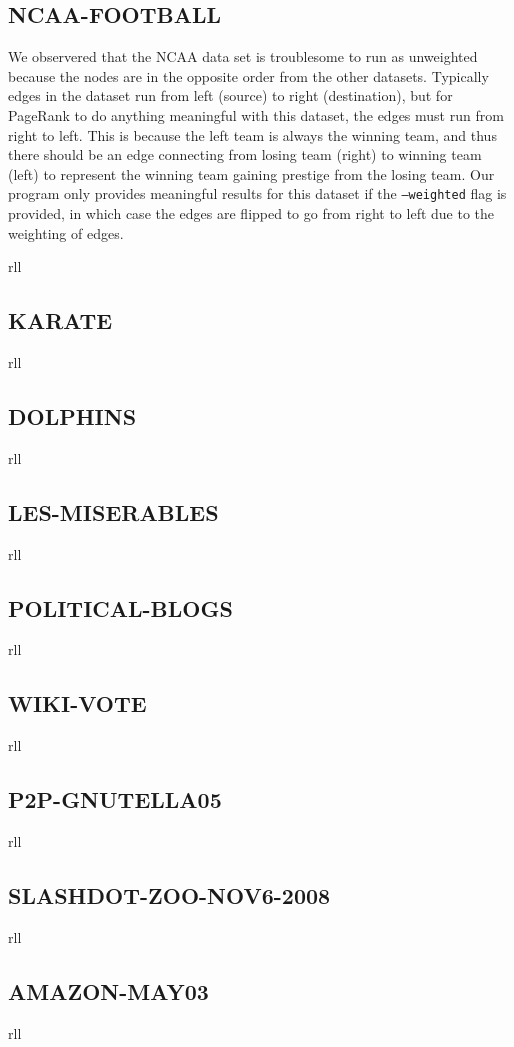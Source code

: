 \documentclass{report}
\newcommand{\results}[1]{{\ttfamily \begin{longtabu}{rll}
                           
                         \end{longtabu}\clearpage}}
\newcommand{\pagerank}{PageRank }
\begin{document}
\subsection{NCAA-FOOTBALL}
We observered that the NCAA data set is troublesome to run as unweighted because
the nodes are in the opposite order from the other datasets. Typically edges in
the dataset run from left (source) to right (destination), but for \pagerank to
do anything meaningful with this dataset, the edges must run from right to left.
This is because the left team is always the winning team, and thus there should
be an edge connecting from losing team (right) to winning team (left) to
represent the winning team gaining prestige from the losing team. Our program
only provides meaningful results for this dataset if the \texttt{--weighted}
flag is provided, in which case the edges are flipped to go from right to left
due to the weighting of edges.

\results{NCAA_football-results.tex}
\subsection{KARATE}
\results{karate-results.tex}
\subsection{DOLPHINS}
\results{dolphins-results.tex}
\subsection{LES-MISERABLES}
\results{lesmis-results.tex}
%
\subsection{POLITICAL-BLOGS}
\results{polblogs-results.tex}
\subsection{WIKI-VOTE}
\results{wiki-Vote-results.tex}
\subsection{P2P-GNUTELLA05}
\results{p2p-Gnutella05-results.tex}
\subsection{SLASHDOT-ZOO-NOV6-2008}
\results{soc-sign-Slashdot081106-results.tex}
\subsection{AMAZON-MAY03}
\results{amazon0505-results.tex}
\end{document}
